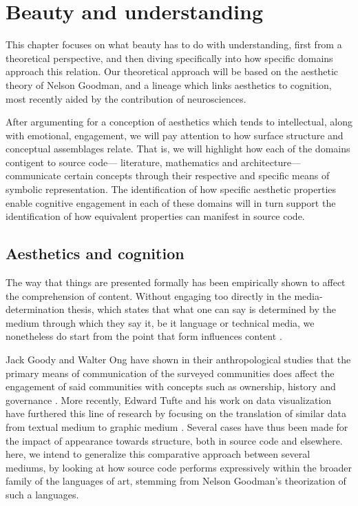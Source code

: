 \chapter{Beauty and understanding}
\label{chap:beauty}


This chapter focuses on what beauty has to do with understanding, first from a theoretical perspective, and then diving specifically into how specific domains approach this relation. Our theoretical approach will be based on the aesthetic theory of Nelson Goodman, and a lineage which links aesthetics to cognition, most recently aided by the contribution of neurosciences.

After argumenting for a conception of aesthetics which tends to intellectual, along with emotional, engagement, we will pay attention to how surface structure and conceptual assemblages relate. That is, we will highlight how each of the domains contigent to source code— literature, mathematics and architecture—communicate certain concepts through their respective and specific means of symbolic representation. The identification of how specific aesthetic properties enable cognitive engagement in each of these domains will in turn support the identification of how equivalent properties can manifest in source code.

\section{Aesthetics and cognition}
\label{sec:aesthetic-cognition}

The way that things are presented formally has been empirically shown to affect the comprehension of content. Without engaging too directly in the media-determination thesis, which states that what one can say is determined by the medium through which they say it, be it language or technical media, we nonetheless do start from the point that form influences content \citep{postman_amusing_1985}.

Jack Goody and Walter Ong have shown in their anthropological studies that the primary means of communication of the surveyed communities does affect the engagement of said communities with concepts such as ownership, history and governance \citep{ong_orality_2012,goody_logic_1986}. More recently, Edward Tufte and his work on data visualization have furthered this line of research by focusing on the translation of similar data from textual medium to graphic medium \citep{tufte_visual_2001}. Several cases have thus been made for the impact of appearance towards structure, both in source code and elsewhere. here, we intend to generalize this comparative approach between several mediums, by looking at how source code performs expressively within the broader family of the languages of art, stemming from Nelson Goodman's theorization of such a languages.

